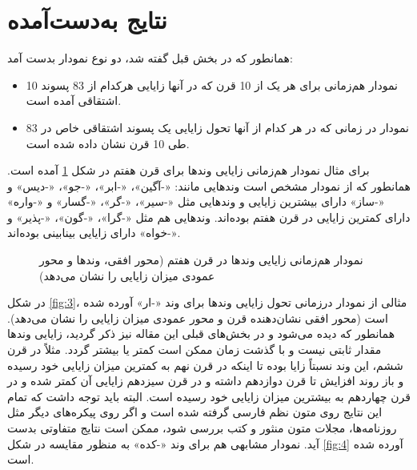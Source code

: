 \documentclass[12pt,onecolumn,a4paper]{article}
\begin{document}
    \section{نتایج به‌دست‌آمده}
    همانطور که در بخش قبل گفته شد، دو نوع نمودار بدست آمد:
    \begin{itemize}
        \item 10 نمودار هم‌زمانی برای هر یک از 10 قرن که در آنها زایایی هرکدام از 83 پسوند اشتقاقی آمده است.
        \item 83 نمودار در زمانی که در هر کدام از آنها تحول زایایی یک پسوند اشتقاقی خاص در طی 10 قرن نشان داده شده است.
    \end{itemize}

    برای مثال نمودار هم‌زمانی زایایی وندها برای قرن هفتم در شکل \ref{fig:2} آمده است. همانطور که از نمودار مشخص است وندهایی مانند: «-آگین»، «-ابر»، «-جو»، «-دیس» و «-ساز» دارای بیشترین زایایی و وندهایی مثل «-سیر»، «-گر»، «-گسار» و «-واره» دارای کمترین زایایی در قرن هفتم بوده‌اند. وندهایی هم مثل «-گرا»، «-گون»، «-پذیر» و «-خواه» دارای زایایی بینابینی بوده‌اند.

    \begin{figure}[H]
        \centering
        \caption{نمودار هم‌زمانی زایایی وندها در قرن هفتم (محور افقی، وندها و محور عمودی میزان زایایی را نشان می‌دهد)}
        \label{fig:2}
    \end{figure}

    در شکل \ref{fig:3}، مثالی از نمودار درزمانی تحول زایایی وندها برای وند «-ار»  آورده شده است (محور افقی نشان‌دهنده قرن و محور عمودی میزان زایایی را نشان می‌دهد). همانطور که دیده می‌شود و در بخش‌های قبلی این مقاله نیز ذکر گردید، زایایی وندها مقدار ثابتی نیست و با گذشت زمان ممکن است کمتر یا بیشتر گردد. مثلاً در قرن ششم، این وند نسبتاً زایا بوده تا اینکه در قرن نهم به کمترین میزان زایایی خود رسیده و باز روند افزایش تا قرن دوازدهم داشته و در قرن سیزدهم زایایی آن کمتر شده و در قرن چهاردهم به بیشترین میزان زایایی خود رسیده است. البته باید توجه داشت که تمام این نتایج روی متون نظم فارسی گرفته شده است و اگر روی پیکره‌های دیگر مثل روزنامه‌ها، مجلات متون منثور و کتب بررسی شود، ممکن است نتایج متفاوتی بدست آید. نمودار مشابهی هم برای وند «-کده» به منظور مقایسه در شکل \ref{fig:4} آورده شده است.
\end{document}
